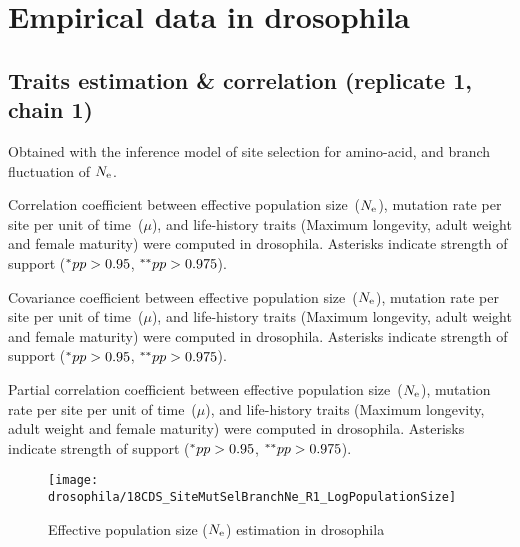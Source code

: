 \section{Empirical data in drosophila}

\subsection{Traits estimation \& correlation (replicate 1, chain 1)}
Obtained with the inference model of site selection for amino-acid, and branch fluctuation of $N_{\mathrm{e}}$.

\begin{table}[H]
    
    \caption[Correlation coefficient matrix in drosophila ($\dnds$)]{
    Correlation coefficient between effective population size~($N_{\mathrm{e}}$), mutation rate per site per unit of time~($\mu$), and life-history traits (Maximum longevity, adult weight and female maturity) were computed in drosophila.
    Asterisks indicate strength of support ($\smash{^{*}} pp > 0.95$, $\smash{^{**}} pp > 0.975$).}
\end{table}

\begin{table}[H]
    
    \caption[Covariance matrix in drosophila]{
    Covariance coefficient between effective population size~($N_{\mathrm{e}}$), mutation rate per site per unit of time~($\mu$), and life-history traits (Maximum longevity, adult weight and female maturity) were computed in drosophila.
    Asterisks indicate strength of support ($\smash{^{*}} pp > 0.95$, $\smash{^{**}} pp > 0.975$).}
\end{table}

\begin{table}[H]
    
    \caption[Partial correlation coefficient matrix in drosophila]{
    Partial correlation coefficient between effective population size~($N_{\mathrm{e}}$), mutation rate per site per unit of time~($\mu$), and life-history traits (Maximum longevity, adult weight and female maturity) were computed in drosophila.
    Asterisks indicate strength of support ($\smash{^{*}} pp > 0.95$, $\smash{^{**}} pp > 0.975$).}
\end{table}

\begin{figure}[H]
    \centering
    \texttt{[image: drosophila/18CDS\_SiteMutSelBranchNe\_R1\_LogPopulationSize]}
    \caption[Effective population size estimation in drosophila]{Effective population size ($N_{\mathrm{e}}$) estimation in drosophila}
\end{figure}

